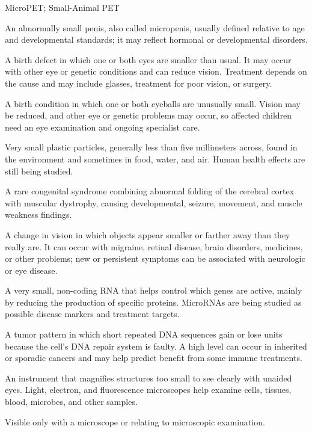 \synonyms
MicroPET; Small-Animal PET

 An abnormally small penis, also called micropenis, usually defined relative to age and developmental standards; it may reflect hormonal or developmental disorders.

 A birth defect in which one or both eyes are smaller than usual.
It may occur with other eye or genetic conditions and can reduce vision. Treatment
depends on the cause and may include glasses, treatment for poor vision, or surgery.

 A birth condition in which one or both eyeballs are unusually small. Vision may be reduced, and other eye or genetic problems may occur, so affected children need an eye examination and ongoing specialist care.

 Very small plastic particles, generally less than five millimeters across, found in the environment and sometimes in food, water, and air. Human health effects are still being studied.

 A rare congenital syndrome combining abnormal folding of the cerebral cortex with muscular dystrophy, causing developmental, seizure, movement, and muscle weakness findings.

 A change in vision in which objects appear smaller or farther away than they really are. It can occur with migraine, retinal disease, brain disorders, medicines, or other problems; new or persistent symptoms can be associated with neurologic or eye disease.

 A very small, non-coding RNA that helps control which genes are active, mainly by reducing the production of specific proteins. MicroRNAs are being studied as possible disease markers and treatment targets.

 A tumor pattern in which short repeated DNA sequences gain or lose units because the cell’s DNA repair system is faulty. A high level can occur in inherited or sporadic cancers and may help predict benefit from some immune treatments.

 An instrument that magnifies structures too small to see clearly with unaided eyes. Light, electron, and fluorescence microscopes help examine cells, tissues, blood, microbes, and other samples.

 Visible only with a microscope or relating to microscopic examination.

